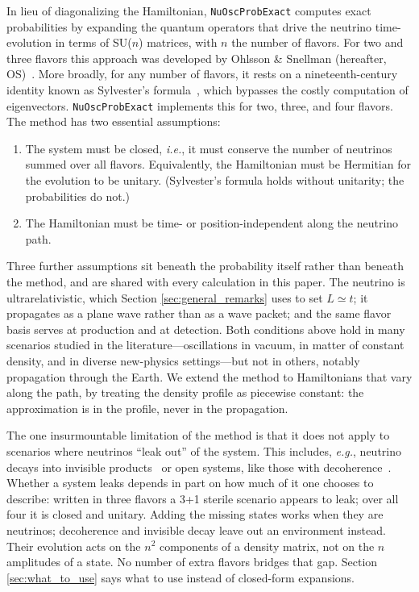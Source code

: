 \documentclass[final,5p,times,twocolumn,sort,compress]{elsarticle}
\newcommand{\ie}{{\it i.e.}}
\newcommand{\eg}{{\it e.g.}}
\begin{document}
In lieu of diagonalizing the Hamiltonian, {\tt NuOscProbExact} computes exact probabilities by expanding the quantum operators that drive the neutrino time-evolution in terms of SU($n$) matrices, with $n$ the number of flavors. For two and three flavors this approach was developed by Ohlsson \& Snellman (hereafter, OS)\ \cite{Ohlsson:1999xb, Ohlsson:1999um, Ohlsson:2000zz, Ohlsson:2001et}.  More broadly, for any number of flavors, it rests on a nineteenth-century identity known as Sylvester's formula\ \cite{Sylvester:1883}, which bypasses the costly computation of eigenvectors. {\tt NuOscProbExact} implements this for two, three, and four flavors.  The method has two essential assumptions:
\begin{enumerate}
 \item
  The system must be closed, \ie, it must conserve the number of neutrinos summed over all flavors.  Equivalently, the Hamiltonian must be Hermitian for  the evolution to be unitary.  (Sylvester's formula holds without unitarity; the probabilities do not.)
 \item
  The Hamiltonian must be time- or position-independent along the neutrino path.
\end{enumerate}
Three further assumptions sit beneath the probability itself rather than beneath the method, and are shared with every calculation in this paper.  The neutrino is ultrarelativistic, which Section \ref{sec:general_remarks} uses to set $L \simeq t$; it propagates as a plane wave rather than as a wave packet; and the same flavor basis serves at production and at detection.  Both conditions above hold in many scenarios studied in the literature---oscillations in vacuum, in matter of constant density, and in diverse new-physics settings---but not in others, notably propagation through the Earth.  We extend the method to Hamiltonians that vary along the path, by treating the density profile as piecewise constant: the approximation is in the profile, never in the propagation.

The one insurmountable limitation of the method is that it does not apply to scenarios where neutrinos ``leak out'' of the system.  This includes, \eg, neutrino decays into invisible products\ \cite{Joshipura:2002fb, Beacom:2002cb, Beacom:2002vi, GonzalezGarcia:2008ru, Baerwald:2012kc, Berryman:2014yoa} or open systems, like those with decoherence\ \cite{Benatti:2000ph, Lisi:2000zt, Ohlsson:2000mj, Carpio:2017nui, Coloma:2018idr}.  Whether a system leaks depends in part on how much of it one chooses to describe: written in three flavors a 3+1 sterile scenario appears to leak; over all four it is closed and unitary. Adding the missing states works when they are neutrinos; decoherence and invisible decay leave out an environment instead. Their evolution acts on the $n^2$ components of a density matrix, not on the $n$ amplitudes of a state.  No number of extra flavors bridges that gap. Section \ref{sec:what_to_use} says what to use instead of closed-form expansions.
\end{document}
